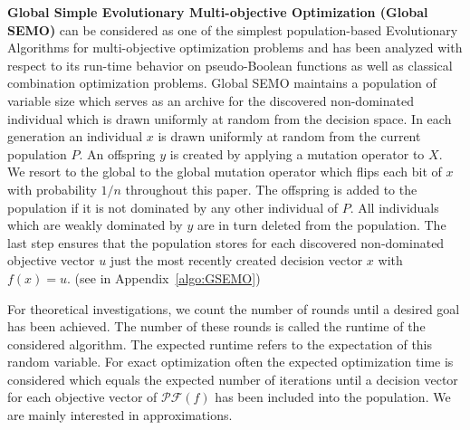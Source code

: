 \vspace{3ex}
\textbf{Global Simple Evolutionary Multi-objective Optimization (Global SEMO)} \cite{horoba2008benefits} can be considered as one of the simplest population-based Evolutionary Algorithms for multi-objective optimization problems and has been analyzed with respect to its run-time behavior on pseudo-Boolean functions\cite{brockhoff2007additional,giel2010effect} as well as classical combination optimization problems. Global SEMO maintains a population of variable size which serves as an archive for the discovered non-dominated individual which is drawn uniformly at random from the decision space. In each generation an individual $x$ is drawn uniformly at random from the current population $P$. An offspring $y$ is created by applying a mutation operator to $X$. We resort to the global to the global mutation operator which flips each bit of $x$ with probability $1/n$ throughout this paper. The offspring is added to the population if it is not dominated by any other individual of $P$. All individuals which are weakly dominated by $y$ are in turn deleted from the population. The last step ensures that the population stores for each discovered non-dominated objective vector $u$ just the most recently created decision vector $x$ with $f(x)=u$. (see in Appendix~\ref{algo:GSEMO})

For theoretical investigations, we count  the number of rounds until a desired goal has been achieved. The number of these rounds is called the runtime of the considered algorithm. The expected runtime refers to the expectation of this random variable. For exact optimization often the expected optimization time is considered which equals the expected number of iterations until a decision vector for each objective vector of $\mathscr{PF}(f)$ has been included into the population. We are mainly interested in approximations.

